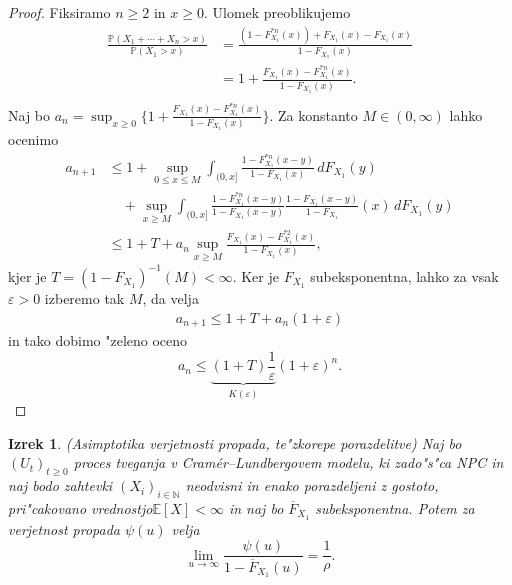 \documentclass[12pt, a4paper, reqno]{amsart}
\theoremstyle{definition}
\theoremstyle{plain}
\newtheorem{izrek}[definicija]{Izrek}
\newcommand{\N}{\mathbb{N}}
\newcommand{\E}{\mathbb{E}}
\newcommand{\Prob}{\mathbb{P}}
\newcommand{\1}{\mathds{1}}
\begin{document}
        \begin{proof}
            Fiksiramo $n\geq2$ in $x\geq0$. Ulomek preoblikujemo
            \begin{align*}
                \frac{\Prob(X_1 + \cdots + X_n > x)}{\Prob(X_1 > x)} 
                &= \frac{(1 - F_{X_1}^{*n}(x)) + F_{X_1}(x) - F_{X_1}(x)}{1 - F_{X_1}(x)} \\
                &= 1 + \frac{F_{X_1}(x) - F_{X_1}^{*n}(x)}{1 - F_{X_1}(x)}. \\
            \end{align*}
            Naj bo $a_n = \sup_{x\geq0}\biggl\{ 1 + \frac{F_{X_1}(x) - F_{X_1}^{*n}(x)}{1 - F_{X_1}(x)}\biggr\}.$ Za 
            konstanto $M\in(0, \infty)$ lahko ocenimo
            \begin{align*}
                a_{n+1} &\leq 1 + \sup_{0\leq x\leq M}\int_{(0,x]}\frac{1 - F_{X_1}^{*n}(x - y)}{1 - F_{X_1}(x)}\, dF_{X_1}(y) \\
                            & \quad + \sup_{x\geq M}\int_{(0, x]}\frac{1 - F_{X_1}^{*n}(x - y)}{1 - F_{X_1}(x - y)}\frac{1 - F_{X_1}(x - y)}{1 - F_{X_1}}(x) \, dF_{X_1}(y) \\
                        &\leq 1 + T + a_n\sup_{x\geq M}\frac{F_{X_1}(x) - F_{X_1}^{*2}(x)}{1 - F_{X_1}(x)},
            \end{align*}
            kjer je $T = (1 - F_{X_1})^{-1}(M) < \infty$. Ker je $F_{X_1}$ subeksponentna, lahko 
            za vsak $\varepsilon > 0$ izberemo tak $M$, da velja
            \begin{align*}
                a_{n+1} \leq 1 + T + a_n(1 + \varepsilon)
            \end{align*}
            in tako dobimo "zeleno oceno
            \begin{equation*}
                a_n \leq \underbrace{(1 + T)\frac{1}{\varepsilon}}_{K(\varepsilon)}(1 + \varepsilon)^n.
            \end{equation*}
        \end{proof}
        
        \begin{izrek}(Asimptotika verjetnosti propada, te"zkorepe porazdelitve)
            Naj bo $(U_t)_{t\geq0}$ proces tveganja v Cramér--Lundbergovem modelu, ki zado"s"ca NPC in 
            naj bodo zahtevki $(X_i)_{i\in\N}$ neodvisni in enako porazdeljeni z gostoto, 
            pri"cakovano vrednostjo\newline $\E\left[X\right] < \infty$ in naj bo $\overline{F}_{X_1}$ subeksponentna.
            Potem za verjetnost propada $\psi(u)$ velja
            \begin{equation}
                \lim_{u\to\infty}\frac{\psi(u)}{1 - \overline{F}_{X_1}(u)} = \frac{1}{\rho}.
                \label{eq:tezkorepnePorazdelitveAsimptotika}
            \end{equation}
            \label{izr:tezkorepnePorazdelitveAsimptotika}
        \end{izrek}
\end{document}
